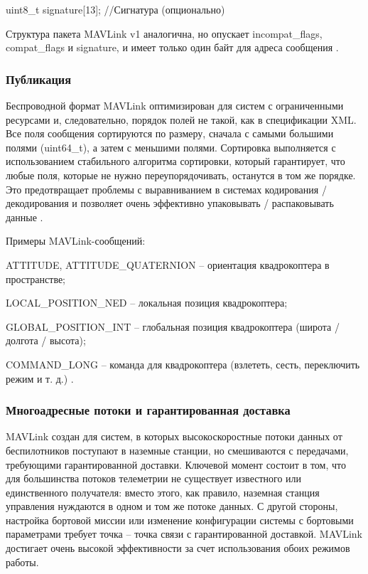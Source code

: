 uint8\_t signature[13];      //Сигнатура (опционально)

Структура пакета MAVLink v1 аналогична, но опускает incompat\_flags, compat\_flags и signature, и имеет только один байт для адреса сообщения \cite{mavlink}.

\subsubsection{Публикация}
Беспроводной формат MAVLink оптимизирован для систем с ограниченными ресурсами и, следовательно, порядок полей не такой, как в спецификации XML. Все поля сообщения сортируются по размеру, сначала с самыми большими полями (uint64\_t), а затем с меньшими полями. Сортировка выполняется с использованием стабильного алгоритма сортировки, который гарантирует, что любые поля, которые не нужно переупорядочивать, останутся в том же порядке. Это предотвращает проблемы с выравниванием в системах кодирования / декодирования и позволяет очень эффективно упаковывать / распаковывать данные \cite{mavlink}.

Примеры MAV\-Link-сообщений:

ATTITUDE, ATTITUDE\_QUATERNION – ориентация квадрокоптера в пространстве;

LOCAL\_POSITION\_NED – локальная позиция квадрокоптера;

GLOBAL\_POSITION\_INT – глобальная позиция квадрокоптера (широта / долгота / высота);

COMMAND\_LONG – команда для квадрокоптера (взлететь, сесть, переключить режим и т. д.) \cite{clover}.

\subsubsection{Многоадресные потоки и гарантированная доставка}
MAVLink создан для систем, в которых высокоскоростные потоки данных от беспилотников поступают в наземные станции, но смешиваются с передачами, требующими гарантированной доставки. Ключевой момент состоит в том, что для большинства потоков телеметрии не существует известного или единственного получателя: вместо этого, как правило, наземная станция управления нуждаются в одном и том же потоке данных.
С другой стороны, настройка бортовой миссии или изменение конфигурации системы с бортовыми параметрами требует точка -- точка связи с гарантированной доставкой. MAVLink достигает очень высокой эффективности за счет использования обоих режимов работы.

